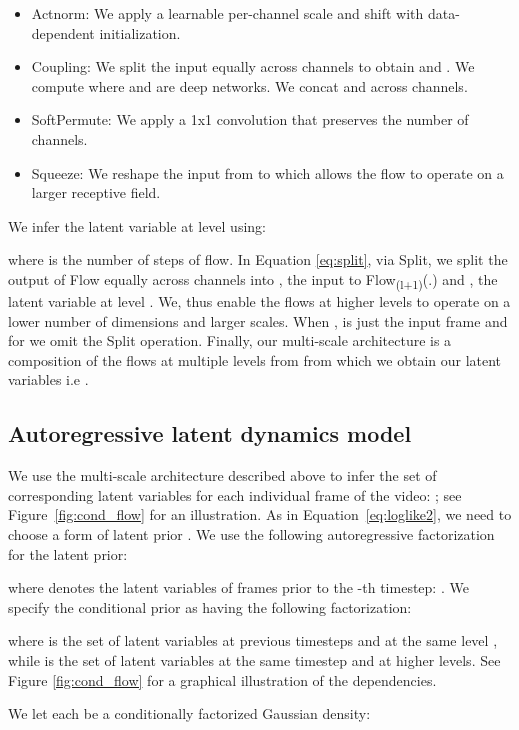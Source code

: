 \documentclass{article} \usepackage{iclr2020_conference,times}
\begin{document}
\begin{itemize}
\item{Actnorm: We apply a learnable per-channel scale and shift with data-dependent initialization.}
\item{Coupling: We split the input  equally across channels to obtain  and . We compute  where  and  are deep networks. We concat  and  across channels.}
\item{SoftPermute: We apply a 1x1 convolution that preserves the number of channels.}
\item{Squeeze: We reshape the input from  to  which allows the flow to operate on a larger receptive field.}
\end{itemize}

We infer the latent variable  at level  using:


where  is the number of steps of flow. In Equation \eqref{eq:split}, via Split, we split the output of Flow equally across channels into , the input to Flow\textsubscript{(l+1)}(.) and , the latent variable at level . We, thus enable the flows at higher levels to operate on a lower number of dimensions and larger scales. When ,  is just the input frame  and for  we omit the Split operation. Finally, our multi-scale architecture  is a composition of the flows at multiple levels from  from which we obtain our latent variables i.e .


\subsection{Autoregressive latent dynamics model}

We use the multi-scale architecture described above to infer the set of corresponding latent variables for each individual frame of the video:
; see Figure~\ref{fig:cond_flow} for an illustration. As in Equation~\eqref{eq:loglike2}, we need to choose a form of latent prior . We use the following autoregressive factorization for the latent prior:

where  denotes the latent variables of frames prior to the -th timestep: . We specify the conditional prior  as having the following factorization:

where  is the set of latent variables at previous timesteps and at the same level , while  is the set of latent variables at the same timestep and at higher levels. See Figure \ref{fig:cond_flow} for a graphical illustration of the dependencies. 

We let each  be a conditionally factorized Gaussian density:
\end{document}
